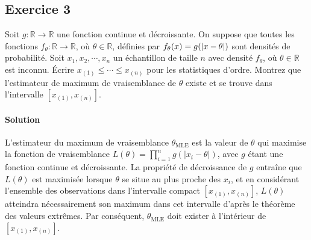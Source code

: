 \documentclass[../main.tex]{subfiles}
\begin{document}
\begin{CJK*}{UTF8}{gbsn}

\section*{Exercice 3}

Soit $g : \mathbb{R} \to \mathbb{R}$ une fonction continue et décroissante. 
On suppose que toutes les fonctions $f_{\theta} : \mathbb{R} \to \mathbb{R}$, 
où $\theta \in \mathbb{R}$, définies par $f_{\theta}(x) = g(\abs{x - \theta})$
sont densités de probabilité.
Soit $x_1, x_2, \cdots, x_n$ un échantillon de taille $n$ avec densité
$f_{\theta}$, où $\theta \in \mathbb{R}$ est inconnu.
Écrire $x_{(1)} \leqslant \cdots \leqslant x_{(n)}$ pour les statistiques d'ordre.
Montrez que l'estimateur de maximum de vraisemblance de $\theta$ existe et se trouve 
dans l'intervalle $[x_{(1)}, x_{(n)}]$.

\paragraph{Solution}
L'estimateur du maximum de vraisemblance $\theta_{\text{MLE}}$ est la valeur de $\theta$ qui 
maximise la fonction de vraisemblance $L(\theta) = \prod_{i=1}^{n} g(|x_i - \theta|)$, avec 
$g$ étant une fonction continue et décroissante. La propriété de décroissance de $g$ entraîne 
que $L(\theta)$ est maximisée lorsque $\theta$ se situe au plus proche des $x_i$, et en 
considérant l'ensemble des observations dans l'intervalle compact $[x_{(1)}, x_{(n)}]$, 
$L(\theta)$ atteindra nécessairement son maximum dans cet intervalle d'après le théorème 
des valeurs extrêmes. Par conséquent, $\theta_{\text{MLE}}$ doit exister à l'intérieur de 
$[x_{(1)}, x_{(n)}]$.

\end{CJK*}
\end{document}
